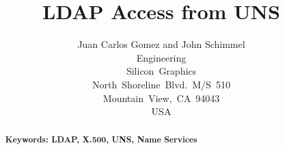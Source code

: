 \documentclass[11pt,times,pcode,dvips]{article}    %
\title{{LDAP Access from UNS}}
\author{Juan Carlos Gomez and John Schimmel \\
\mbox{\small Engineering} \\
\mbox{\small Silicon Graphics} \\
\mbox{\small North Shoreline Blvd. M/S 510} \\
\mbox{\small Mountain View, CA 94043} \\
\mbox{\small USA} \\
}
\date{}
\begin{document}

\maketitle                %

\begin{abstract}

\vspace{20 pt}
{\bf Keywords: LDAP, X.500, UNS, Name Services}


\end{abstract}

\clearpage



\clearpage

%
%
\end{document}
